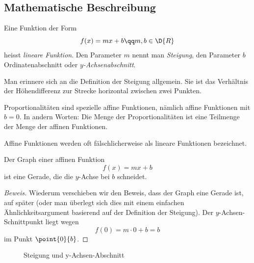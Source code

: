 \documentclass[%
11pt,%
twoside,%
titlepage,%
german,%
headsepline%
]{scrartcl}
\begin{document}
\subsection{Mathematische Beschreibung}
\begin{cdef}{}
Eine Funktion der Form
$$f(x)=mx+b\qq m,b\in\D{R}$$
heisst \emph{lineare Funktion}. Den Parameter $m$ nennt man \emph{Steigung}, den Parameter $b$ Ordinatenabschnitt oder \emph{$y$-Achsenabschnitt}.
\end{cdef}
\begin{bem}
Man erinnere sich an die Definition der Steigung allgemein. Sie ist das Verh\"altnis der H\"ohendifferenz zur Strecke horizontal zwischen zwei Punkten.
\end{bem}
\begin{bem}
Proportionalit\"aten sind spezielle affine Funktionen, n\"amlich affine Funktionen mit $b=0$. In andern Worten: Die Menge der Proportionalit\"aten ist eine Teilmenge der Menge der affinen Funktionen.
\end{bem}
\begin{bem}
Affine Funktionen werden oft f\"alschlicherweise als lineare Funktionen bezeichnet.
\end{bem}
\begin{csatz}[Gerade]{}
Der Graph einer affinen Funktion
$$f(x)=mx+b$$
ist eine Gerade, die die $y$-Achse bei $b$ schneidet.
\end{csatz}
\begin{proof}[Beweis]
Wiederum verschieben wir den Beweis, dass der Graph eine Gerade ist, auf sp\"ater (oder man \"uberlegt sich dies mit einem einfachen \"Ahnlichkeitsargument basierend auf der Definition der Steigung). Der $y$-Achsen-Schnittpunkt liegt wegen
$$f(0)=m\cdot0+b=b$$
im Punkt $\point{0}{b}$.
\end{proof}
\begin{figure}[h!]
\begin{center}
\end{center}
\caption{Steigung und y-Achsen-Abschnitt}
\end{figure}
\end{document}
